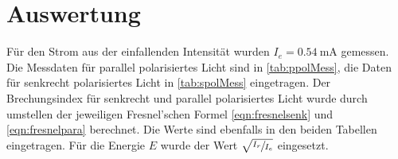 \section{Auswertung}
\label{sec:Auswertung}

Für den Strom aus der einfallenden Intensität wurden $I_e = \SI{0,54}{\milli\ampere}$ gemessen. Die Messdaten für parallel polarisiertes Licht sind in
\autoref{tab:ppolMess}, die Daten für senkrecht polarisiertes Licht in \autoref{tab:spolMess} eingetragen. Der Brechungsindex für senkrecht und parallel
polarisiertes Licht wurde durch umstellen der jeweiligen Fresnel'schen Formel \eqref{eqn:fresnelsenk} und \eqref{eqn:fresnelpara} berechnet. Die Werte sind ebenfalls in den beiden Tabellen eingetragen.
Für die Energie $E$ wurde der Wert $\sqrt{\sfrac{I_r}{I_e}}$ eingesetzt.
\newpage


